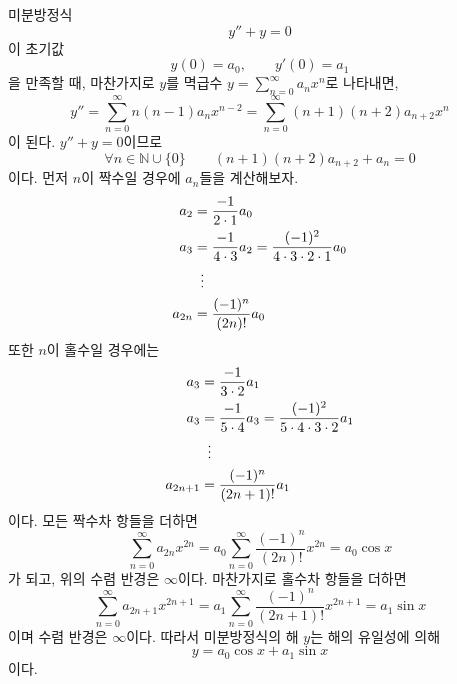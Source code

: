 \documentclass[../engineering_mathematics_lecture_note.tex]{subfiles}
\begin{document}
\begin{example}
    미분방정식
    \begin{equation*}
        y'' + y = 0
    \end{equation*}
    이 초기값
    \begin{equation*}
        y(0) = a_0, \qquad y'(0) = a_1
    \end{equation*}
    을 만족할 때, 마찬가지로 $y$를 멱급수 $y = \sum_{n = 0}^\infty a_n x^n$로 나타내면,
    \begin{equation*}
        y'' = \sum^{\infty}_{n = 0} n (n - 1) a_n x^{n - 2} = \sum^{\infty}_{n = 0} (n + 1) (n + 2) a_{n + 2} x^n
    \end{equation*}
    이 된다.
    $y'' + y = 0$이므로
    \begin{equation*}
        \forall n \in \mathbb N \cup \{0\} \qquad  (n + 1) (n + 2) a_{n + 2} + a_n = 0
    \end{equation*}
    이다.
    먼저 $n$이 짝수일 경우에 $a_n$들을 계산해보자.
    \begin{align*}
        a_2 &= \frac{-1}{2 \cdot 1} a_0\\
        a_3 &= \frac{-1}{4 \cdot 3} a_2 = \frac{(-1)^2}{4 \cdot 3 \cdot 2 \cdot 1} a_0\\
            &\vdotswithin{=}\\
        a_{2n} &= \frac{(-1)^n}{(2n)!} a_0
    \end{align*}
    또한 $n$이 홀수일 경우에는
    \begin{align*}
        a_3 &= \frac{-1}{3 \cdot 2} a_1\\
        a_3 &= \frac{-1}{5 \cdot 4} a_3 = \frac{(-1)^2}{5 \cdot 4 \cdot 3 \cdot 2} a_1\\
            &\vdotswithin{=}\\
        a_{2n + 1} &= \frac{(-1)^n}{(2n + 1)!} a_1
    \end{align*}
    이다.
    모든 짝수차 항들을 더하면
    \begin{equation*}
        \sum^{\infty}_{n = 0} a_{2n} x^{2n} = a_0 \sum^{\infty}_{n = 0} \frac{(-1)^n}{(2n)!} x^{2n} = a_0 \cos x
    \end{equation*}
    가 되고, 위의 수렴 반경은 $\infty$이다.
    마찬가지로 홀수차 항들을 더하면
    \begin{equation*}
        \sum^{\infty}_{n = 0} a_{2n + 1} x^{2n + 1} = a_1 \sum^{\infty}_{n = 0} \frac{(-1)^n}{(2n + 1)!} x^{2n + 1} = a_1 \sin x
    \end{equation*}
    이며 수렴 반경은 $\infty$이다.
    따라서 미분방정식의 해 $y$는 해의 유일성에 의해
    \begin{equation*}
        y = a_0 \cos x + a_1 \sin x
    \end{equation*}
    이다.
\end{example}
\end{document}
